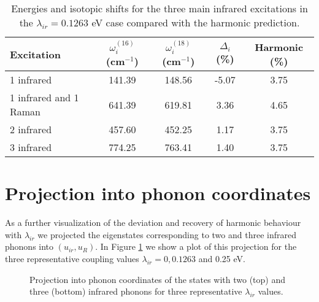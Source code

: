 \begin{table}[ht]
  \centering
  \begin{tabular}[ht]{|l|c|c|c|c|}
    \hline
    Excitation & $\omega_i^{(16)}$ (cm$^{-1}$) & $\omega_i^{(18)}$ (cm$^{-1}$) & $\Delta_i$ (\%) & Harmonic (\%)\\
    \hline
    1 infrared              & 141.39 & 148.56 & -5.07 & 3.75 \\
    1 infrared and 1 Raman  & 641.39 & 619.81 &  3.36 & 4.65 \\
    2 infrared              & 457.60 & 452.25 &  1.17 & 3.75 \\
    3 infrared              & 774.25 & 763.41 &  1.40 & 3.75 \\
    \hline
    \end{tabular}
    \caption[Energies and isotopic shifts for the infrared excitations in the $\lambda_{ir}=0.1263$ eV case.]
    {Energies and isotopic shifts for the three main infrared excitations in the $\lambda_{ir}=0.1263$ eV case compared with the harmonic prediction.}
    \label{tab:irIsotShifts}
\end{table}

\section{Projection into phonon coordinates}
\label{sec:irPhononProj}

As a further visualization of the deviation and recovery of harmonic behaviour with $\lambda_{ir}$ we projected the eigenstates corresponding to two and three infrared phonons into $(u_{ir},u_R)$.
In Figure \ref{fig:phononProj2-3ir} we show a plot of this projection for the three representative coupling values $\lambda_{ir}=0,0.1263$ and 0.25 eV.

\begin{figure}[ht]
  \centering
  
  \caption[Projection into phonon coordinates of the states with two and three infrared phonons.]
  {Projection into phonon coordinates of the states with two (top) and three (bottom) infrared phonons for three representative $\lambda_{ir}$ values.}
  \label{fig:phononProj2-3ir}
\end{figure}

